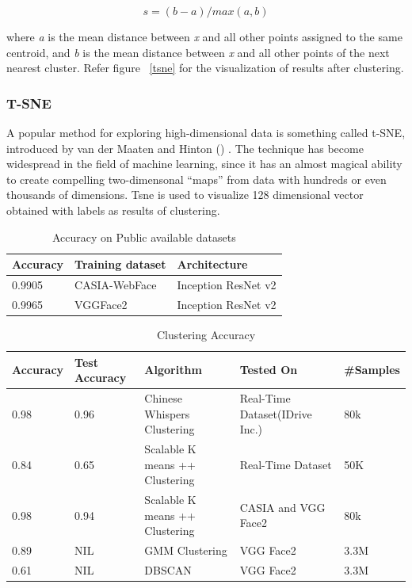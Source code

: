 \documentclass[a4paper,12pt, twoside]{NITKReport}
\begin{document}
\begin{equation}
s = (b-a)/max(a,b)
\end{equation}

\par where \textit{a} is the mean distance between \textit{x} and all other points
assigned to the same centroid, and \textit{b} is the mean distance between \textit{x} and all other points of the next nearest cluster. Refer figure ~\ref{tsne} for the visualization of results after clustering.

\subsubsection{T-SNE}
A popular method for exploring high-dimensional data is something called t-SNE, introduced by van der Maaten and Hinton (\cite{maaten2008visualizing}) . The technique has become widespread in the field of machine learning, since it has an almost magical ability to create compelling two-dimensonal “maps” from data with hundreds or even thousands of dimensions. Tsne is used to visualize 128 dimensional vector obtained with labels as results of clustering.

\begin{table}[h]
  \centering
\begin{tabular}{ |p{4cm}|p{4cm}|p{4cm}|}
\hline
Accuracy & Training dataset & Architecture\\
\hline
0.9905 & CASIA-WebFace & Inception ResNet v2 \\
\hline
0.9965 & VGGFace2 &	Inception ResNet v2 \\
\hline
\end{tabular}
\caption{Accuracy on Public available datasets}\label{table:acc_}
\end{table}


\begin{table}[h]
  \centering
\begin{tabular}{ |p{1.5cm}|p{1.5cm}|p{3.5cm}|p{4cm}|p{2cm}|}
\hline
Accuracy & Test Accuracy & Algorithm & Tested On & \#Samples\\
\hline
0.98 & 0.96 & Chinese Whispers Clustering & Real-Time Dataset(IDrive Inc.) & 80k \\
\hline
0.84 & 0.65 & Scalable K means ++ Clustering & Real-Time Dataset & 50K \\
\hline
0.98 & 0.94 & Scalable K means ++ Clustering & CASIA and VGG Face2 & 80k \\
\hline
0.89 & NIL & GMM Clustering & VGG Face2 & 3.3M \\
\hline
0.61 & NIL & DBSCAN & VGG Face2 & 3.3M \\
\hline
\end{tabular}
\caption{Clustering Accuracy}\label{table:cluster}
\end{table}
\end{document}
